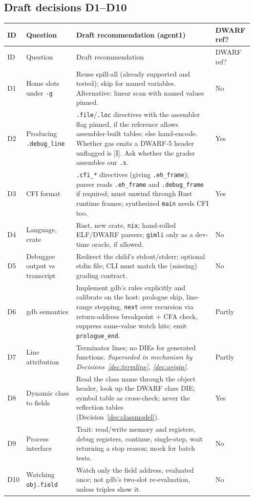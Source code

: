 \documentclass[10pt]{article}
\newcommand{\code}[1]{\texttt{\small #1}}
\newcommand{\mI}{\textsf{\scriptsize[I]}}
\begin{document}
\subsection{Draft decisions D1--D10}\label{sec:p4-decisions}
\begin{xltabular}{\linewidth}{@{}L{0.6cm}L{3.5cm}Y L{1.3cm}@{}}
\toprule
ID & Question & Draft recommendation (agent1) & DWARF ref? \\
\midrule
\endfirsthead
\toprule ID & Question & Draft recommendation & DWARF ref? \\ \midrule
\endhead
D1 & Home slots under \code{-g} & Reuse spill-all (already supported and tested); skip  for named variables. Alternative: linear scan with named values pinned. & No \\
D2 & Producing \code{.debug\_line} & \code{.file}/\code{.loc} directives with the assembler flag pinned, if the reference allows assembler-built tables; else hand-encode. Whether gas emits a DWARF-5 header unflagged is \mI. Ask whether the grader assembles our \code{.s}. & Yes \\
D3 & CFI format & \code{.cfi\_*} directives (giving \code{.eh\_frame}); parser reads \code{.eh\_frame} and \code{.debug\_frame} if required; must unwind through Rust runtime frames; synthesized \code{main} needs CFI too. & Yes \\
D4 & Language, crate & Rust, new  crate, \code{nix}; hand-rolled ELF/DWARF parsers; \code{gimli} only as a dev-time oracle, if allowed. & No \\
D5 & Debuggee output vs transcript & Redirect the child's stdout/stderr; optional stdin file; CLI must match the (missing) grading contract. & No \\
D6 & gdb semantics & Implement gdb's rules explicitly and calibrate on the host: prologue skip, line-range stepping, \code{next} over recursion via return-address breakpoint + CFA check, suppress same-value watch hits; emit \code{prologue\_end}. & Partly \\
D7 & Line attribution & Terminator lines; no DIEs for generated functions. \emph{Superseded in mechanism by Decisions~\ref{dec:termline}, \ref{dec:origin}.} & Partly \\
D8 & Dynamic class to fields & Read the class name through the object header, look up the DWARF class DIE; symbol table as cross-check; never the reflection tables (Decision~\ref{dec:classmodel}). & Yes \\
D9 & Process interface & Trait: read/write memory and registers, debug registers, continue, single-step, wait returning a stop reason; mock for batch tests. & No \\
D10 & Watching \code{obj.field} & Watch only the field address, evaluated once; not gdb's two-slot re-evaluation, unless triples show it. & No \\
\bottomrule
\end{xltabular}
\end{document}
